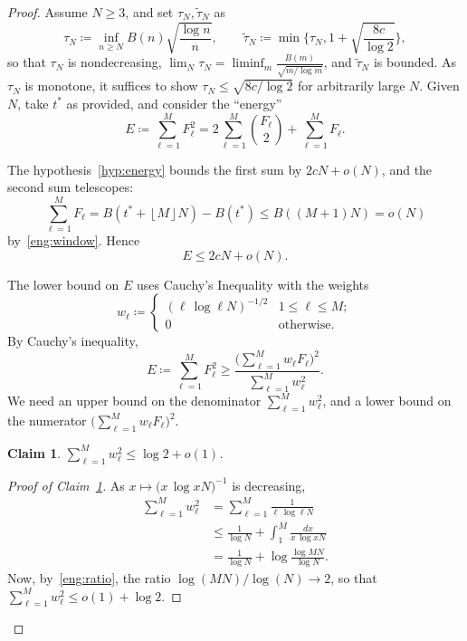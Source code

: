 \documentclass[10pt,a4paper]{amsart}
\newtheorem{claim}{Claim}
\newcommand{\floor}[1]{\mbox{$\left\lfloor #1 \right\rfloor$}}
\begin{document}
\begin{proof}
Assume $N\ge 3$, and set $\tau_N,\widetilde{\tau}_N$ as
  \begin{equation}\label{def tau}
    \tau_N \coloneqq \inf_{n\ge N} B(n)\sqrt{\frac{\log n}{n}},
    \qquad 
    \widetilde{\tau}_N \coloneqq \min\{\tau_N , 1+\sqrt{\frac{8c}{\log 2}}\},
  \end{equation}
so that $\tau_N$ is nondecreasing, $\lim_N\tau_N=\liminf_m \frac{B(m)}{\sqrt{m/\log m}}$, and $\widetilde{\tau}_N$ is bounded.
As $\tau_N$ is monotone, it suffices to show $\tau_N\le
\sqrt{8c/\log2}$ for arbitrarily large $N$. 
Given $N$, take $t^\ast$ as provided, and consider the ``energy''
  \[E\coloneqq \sum_{\ell=1}^{M}F_\ell^2
      =2\sum_{\ell=1}^{M}\binom{F_\ell}{2}+\sum_{\ell=1}^{M}F_\ell.\]

The hypothesis~\eqref{hyp:energy} bounds the first sum by $2cN+o(N)$, and the second sum telescopes:
  \[\sum_{\ell=1}^{M}F_\ell=B(t^\ast+\floor{M}N)-B(t^\ast)\le B((M+1)N) = o(N)\]
by~\ref{eng:window}. Hence 
\begin{equation}\label{eq:upper}
  E\le 2cN+o(N).
\end{equation}

The lower bound on $E$ uses Cauchy's Inequality with the weights
\[
   w_\ell\coloneqq \begin{cases}
    \left( \ell\,\log \ell N \right)^{-1/2} & 1\le\ell\le M; \\
    0 & \text{otherwise.}
   \end{cases}
\]
By Cauchy's inequality,
\begin{equation}\label{eq:CS}
   E \coloneqq \sum_{\ell=1}^{M}F_\ell^{2}
   \ge \frac{\bigl(\sum_{\ell=1}^{M}w_\ell F_\ell\bigr)^{2}}
           {\sum_{\ell=1}^{M}w_\ell^{2}} .
\end{equation}
We need an upper bound on the denominator ${\sum_{\ell=1}^{M}w_\ell^{2}}$, and a lower bound on the numerator $\bigl(\sum_{\ell=1}^{M}w_\ell F_\ell\bigr)^{2}$.

\begin{claim}\label{eq:den}
    \(\displaystyle {\sum_{\ell=1}^{M}w_\ell^{2}} \le \log 2 + o(1)\).
\end{claim}
\begin{proof}[Proof of Claim~\ref{eq:den}]
As $x\mapsto\bigl(x\,\log xN \bigr)^{-1}$ is decreasing,
\begin{align*}
   \sum_{\ell=1}^{M}w_\ell^{2}
   &=\sum_{\ell=1}^{M}\frac{1}{\ell\,\log \ell N}\\
   &\le\frac{1}{\log N}+\int_{1}^{M}\frac{dx}{x\,\log xN}\\
   &=\frac{1}{\log N}+\log\frac{\log MN}{\log N}.
\end{align*}
Now, by~\ref{eng:ratio}, the ratio $\log(MN)/\log(N)\to 2$, so that 
  \(   \sum_{\ell=1}^{M}w_\ell^{2}\le o(1)+\log 2.\)
\end{proof}


\end{proof}
\end{document}
